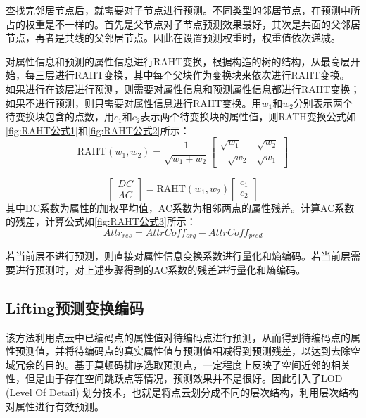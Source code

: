 \documentclass[bachelor,print,msfonts]{xduthesis}
\begin{document}
查找完邻居节点后，就需要对子节点进行预测。不同类型的邻居节点，在预测中所占的权重是不一样的。首先是父节点对子节点预测效果最好，其次是共面的父邻居节点，再者是共线的父邻居节点。因此在设置预测权重时，权重值依次递减。

对属性信息和预测的属性信息进行RAHT变换，根据构造的树的结构，从最高层开始，每三层进行RAHT变换，其中每个父块作为变换块来依次进行RAHT变换。
如果进行在该层进行预测，则需要对属性信息和预测属性信息都进行RAHT变换；如果不进行预测，则只需要对属性信息进行RAHT变换。用$w_1$和$w_2$分别表示两个待变换块包含的点数，用$c_1$和$c_2$表示两个待变换块的属性值，则RATH变换公式如\ref{fig:RAHT公式1}和\ref{fig:RAHT公式2}所示：
\begin{equation}
    \mathrm{RAHT}\left(w_{1}, w_{2}\right)=\frac{1}{\sqrt{w_{1}+w_{2}}}\left[\begin{array}{cc}
            \sqrt{w_{1}}  & \sqrt{w_{2}} \\
            -\sqrt{w_{2}} & \sqrt{w_{1}}
        \end{array}\right]
    \label{fig:RAHT公式1}
\end{equation}

\begin{equation}
    \left[\begin{array}{l}
            D C \\
            A C
        \end{array}\right]=\mathrm{RAHT}\left(w_{1}, w_{2}\right)\left[\begin{array}{l}
            c_{1} \\
            c_{2}
        \end{array}\right]
    \label{fig:RAHT公式2}
\end{equation}
其中DC系数为属性的加权平均值，AC系数为相邻两点的属性残差。计算AC系数的残差，计算公式如\ref{fig:RAHT公式3}所示：
\begin{equation}
    Attr _ {res }=  AttrCoff_{org} -  AttrCoff_{pred }
    \label{fig:RAHT公式3}
\end{equation}

若当前层不进行预测，则直接对属性信息变换系数进行量化和熵编码。若当前层需要进行预测时，对上述步骤得到的AC系数的残差进行量化和熵编码。

\subsection{Lifting预测变换编码}
该方法利用点云中已编码点的属性值对待编码点进行预测，从而得到待编码点的属性预测值，并将待编码点的真实属性值与预测值相减得到预测残差，以达到去除空域冗余的目的。基于莫顿码排序选取预测点，一定程度上反映了空间近邻的相关性，但是由于存在空间跳跃点等情况，预测效果并不是很好。因此引入了LOD (Level Of Detail) 划分技术\cite{ref20}，也就是将点云划分成不同的层次结构，利用层次结构对属性进行有效预测。
\end{document}
